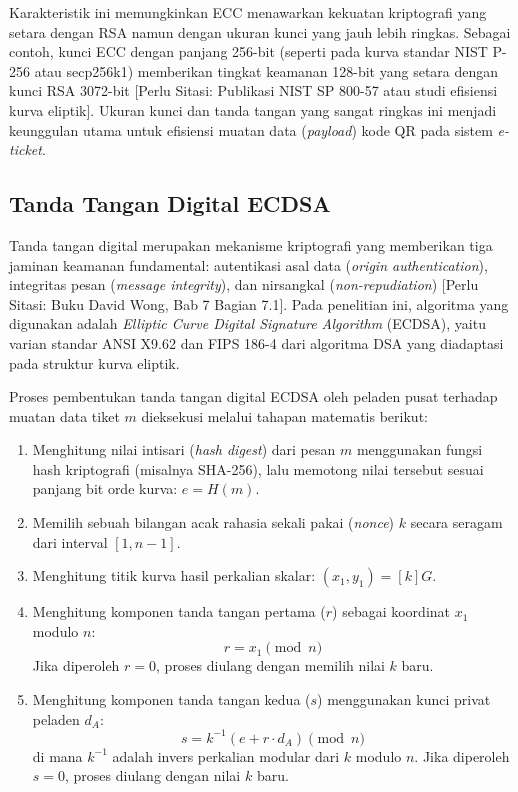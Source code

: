 Karakteristik ini memungkinkan ECC menawarkan kekuatan kriptografi yang setara dengan RSA namun dengan ukuran kunci yang jauh lebih ringkas. Sebagai contoh, kunci ECC dengan panjang 256-bit (seperti pada kurva standar NIST P-256 atau secp256k1) memberikan tingkat keamanan 128-bit yang setara dengan kunci RSA 3072-bit [Perlu Sitasi: Publikasi NIST SP 800-57 atau studi efisiensi kurva eliptik]. Ukuran kunci dan tanda tangan yang sangat ringkas ini menjadi keunggulan utama untuk efisiensi muatan data (\textit{payload}) kode QR pada sistem \textit{e-ticket}.

\subsection{Tanda Tangan Digital ECDSA}
Tanda tangan digital merupakan mekanisme kriptografi yang memberikan tiga jaminan keamanan fundamental: autentikasi asal data (\textit{origin authentication}), integritas pesan (\textit{message integrity}), dan nirsangkal (\textit{non-repudiation}) [Perlu Sitasi: Buku David Wong, Bab 7 Bagian 7.1]. Pada penelitian ini, algoritma yang digunakan adalah \textit{Elliptic Curve Digital Signature Algorithm} (ECDSA), yaitu varian standar ANSI X9.62 dan FIPS 186-4 dari algoritma DSA yang diadaptasi pada struktur kurva eliptik.

Proses pembentukan tanda tangan digital ECDSA oleh peladen pusat terhadap muatan data tiket $m$ dieksekusi melalui tahapan matematis berikut:
\begin{enumerate}
    \item Menghitung nilai intisari (\textit{hash digest}) dari pesan $m$ menggunakan fungsi hash kriptografi (misalnya SHA-256), lalu memotong nilai tersebut sesuai panjang bit orde kurva: $e = H(m)$.
    \item Memilih sebuah bilangan acak rahasia sekali pakai (\textit{nonce}) $k$ secara seragam dari interval $[1, n-1]$.
    \item Menghitung titik kurva hasil perkalian skalar: $(x_1, y_1) = [k]G$.
    \item Menghitung komponen tanda tangan pertama ($r$) sebagai koordinat $x_1$ modulo $n$:
    \begin{equation}
        r = x_1 \pmod n
    \end{equation}
    Jika diperoleh $r = 0$, proses diulang dengan memilih nilai $k$ baru.
    \item Menghitung komponen tanda tangan kedua ($s$) menggunakan kunci privat peladen $d_A$:
    \begin{equation}
        s = k^{-1} (e + r \cdot d_A) \pmod n
    \end{equation}
    di mana $k^{-1}$ adalah invers perkalian modular dari $k$ modulo $n$. Jika diperoleh $s = 0$, proses diulang dengan nilai $k$ baru.
\end{enumerate}

